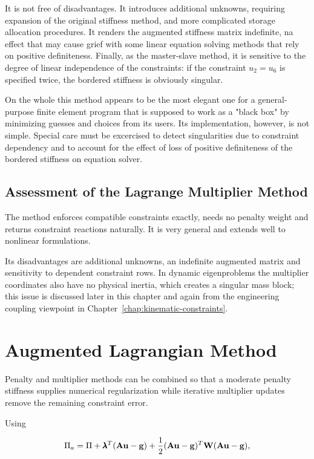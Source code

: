 It is not free of disadvantages. It introduces additional unknowns, requiring
expansion of the original stiffness method, and more complicated storage allocation
procedures. It renders the augmented stiffness matrix indefinite, na effect that
may cause grief with some linear equation solving methods that rely on positive
definiteness. Finally, as the master-slave method, it is sensitive to the degree
of linear independence of the constraints: if the constraint $ u_2 = u_6 $ is
specified twice, the bordered stiffness is obviously singular.

On the whole this method appears to be the most elegant one for a general-purpose
finite element program that is supposed to work as a "black box" by minimizing
guesses and choices from its users. Its implementation, however, is not simple.
Special care must be excercised to detect singularities due to constraint
dependency and to account for the effect of loss of positive definiteness of the
bordered stiffness on equation solver.



\subsection{Assessment of the Lagrange Multiplier Method}

The method enforces compatible constraints exactly, needs no penalty weight and
returns constraint reactions naturally. It is very general and extends well to
nonlinear formulations.

Its disadvantages are additional unknowns, an indefinite augmented matrix and
sensitivity to dependent constraint rows. In dynamic eigenproblems the multiplier
coordinates also have no physical inertia, which creates a singular mass block;
this issue is discussed later in this chapter and again from the engineering
coupling viewpoint in Chapter~\ref{chap:kinematic-constraints}.

\section{Augmented Lagrangian Method}\label{sec:mfc-augmented-lagrange}

Penalty and multiplier methods can be combined so that a moderate penalty
stiffness supplies numerical regularization while iterative multiplier updates
remove the remaining constraint error.

Using

\begin{equation}
    \Pi_a=
    \Pi+
    \pmb{\lambda}^T(\mathbf{A}\mathbf{u}-\mathbf{g})+
    \frac{1}{2}(\mathbf{A}\mathbf{u}-\mathbf{g})^T
    \mathbf{W}(\mathbf{A}\mathbf{u}-\mathbf{g}),
\end{equation}

